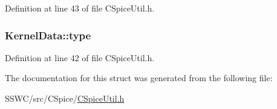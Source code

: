 Definition at line 43 of file C\+Spice\+Util.\+h.

\hypertarget{struct_kernel_data_ae5f44d63e81e8b9a360f2f90383bc90e}{
\subsubsection[{type}]{ Kernel\+Data\+::type}}\label{struct_kernel_data_ae5f44d63e81e8b9a360f2f90383bc90e}


Definition at line 42 of file C\+Spice\+Util.\+h.



The documentation for this struct was generated from the following file\+:\begin{DoxyCompactItemize}
\item 
S\+S\+W\+C/src/\+C\+Spice/\hyperlink{_c_spice_util_8h}{C\+Spice\+Util.\+h}\end{DoxyCompactItemize}
